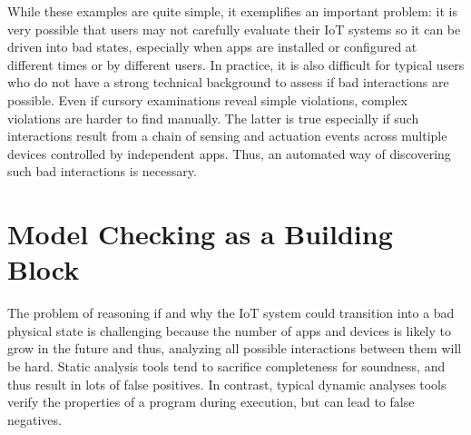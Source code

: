 {\color{black}While these examples are quite simple, it exemplifies an important problem:
it is very possible that users may not carefully evaluate their IoT systems so
it can be driven into bad states,
especially when apps are installed or configured at different times
or by different users.
In practice, it is also difficult for typical users who do not have a strong
technical background to assess if bad interactions are possible.
Even if cursory examinations reveal simple violations,
complex violations are harder to find manually.
The latter is true especially if such interactions result from a chain of
sensing and actuation events across multiple devices controlled
by independent apps.
Thus, an automated way of discovering such bad interactions is necessary.}

\section{Model Checking as a Building Block}
The problem of reasoning if and why the IoT system
could transition into a bad physical state
is challenging because the number of apps and devices is likely to
grow in the future and thus, analyzing all possible interactions
between them will be hard.
Static analysis tools tend to sacrifice completeness for soundness,
and thus result in lots of false positives.
In contrast, typical dynamic analyses tools
verify the properties of a program during execution,
but can lead to false negatives.

